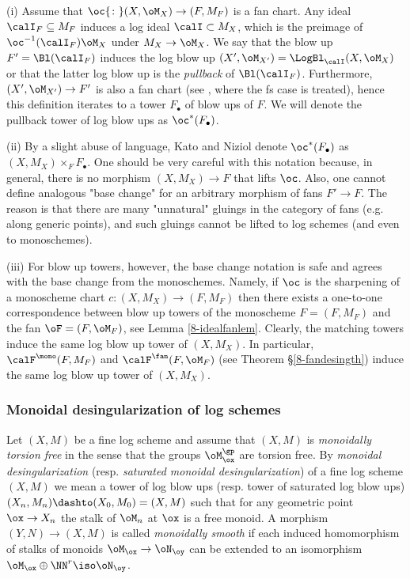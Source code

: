 \documentclass[10pt]{../fichiers-configuration-latex/smfart}
\begin{document}
\begin{remark2}\label{8-fanchartrem} (i) Assume that
$\oc{\colon}(X,\oM_X)\to(F,M_F)$ is a fan chart. Any ideal
$\calI_F\subseteq M_F$ induces a log ideal $\calI\subset
M_X$, which is the preimage of $\oc^{-1}(\calI_F)\oM_X$
under $M_X\to\oM_X$. We say that the blow up $F'=\Bl(\calI_F)$
induces the log blow up $(X',\oM_{X'})=\LogBl_\calI(X,\oM_X)$
or that the latter log blow up is the {\em pullback} of
$\Bl(\calI_F)$. Furthermore, $(X',\oM_{X'})\to F'$ is also a fan
chart (see \cite[9.9]{Toric@Kato}, where the fs case is treated),
hence this definition iterates to a tower $F_\bullet$ of blow ups
of $F$. We will denote the pullback tower of log blow ups as
$\oc^*(F_\bullet)$.

(ii) By a slight abuse of language, Kato and Niziol denote
$\oc^*(F_\bullet)$ as $(X,M_X)\times_FF_\bullet$. One should be very
careful with this notation because, in general, there is no morphism
$(X,M_X)\to F$ that lifts $\oc$. Also, one cannot define analogous
"base change" for an arbitrary morphism of fans $F'\to F$. The reason
is that there are many "unnatural" gluings in the category of fans
(e.g. along generic points), and such gluings cannot be lifted to
log schemes (and even to monoschemes).

(iii) For blow up towers, however, the base change
notation is safe and agrees with the base change from
the monoschemes. Namely, if $\oc$ is the sharpening of a
monoscheme chart $c{\colon}(X,M_X)\to(F,M_F)$ then there exists
a one-to-one correspondence between blow up towers of the
monoscheme $F=(F,M_F)$ and the fan $\oF=(F,\oM_F)$, see Lemma
\ref{8-idealfanlem}. Clearly, the matching towers induce the same
log blow up tower of $(X,M_X)$. In particular, $\calF^\mono(F,M_F)$
and $\calF^\fan(F,\oM_F)$ (see Theorem \S\ref{8-fandesingth})
induce the same log blow up tower of $(X,M_X)$.  \end{remark2}

\subsubsection{Monoidal desingularization of log
schemes}\label{8-monoidaldessec} Let $(X,M)$ be a fine log
scheme and assume that $(X,M)$ is {\em monoidally torsion free}
in the sense that the groups $\oM^\gp_\ox$ are torsion free. By
{\em monoidal desingularization} (resp. {\em saturated monoidal
desingularization}) of a fine log scheme $(X,M)$ we mean a
tower of log blow ups (resp. tower of saturated log blow ups)
$(X_n,M_n)\dashto (X_0,M_0)=(X,M)$ such that for any geometric
point $\ox\to X_n$ the stalk of $\oM_n$ at $\ox$ is a free monoid. A
morphism $(Y,N)\to(X,M)$ is called {\em monoidally smooth} if each
induced homomorphism of stalks of monoids $\oM_\ox\to\oN_\oy$ can
be extended to an isomorphism $\oM_\ox\oplus\NN^r\iso\oN_\oy$.
\end{document}
